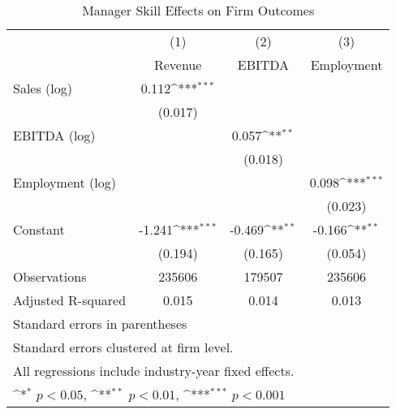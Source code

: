 \begin{table}[htbp]\centering
\def\sym#1{\ifmmode^{#1}\else\(^{#1}\)\fi}
\caption{Manager Skill Effects on Firm Outcomes}
\begin{tabular}{l*{3}{c}}
\toprule
                    &\multicolumn{1}{c}{(1)}&\multicolumn{1}{c}{(2)}&\multicolumn{1}{c}{(3)}\\
                    &\multicolumn{1}{c}{Revenue}&\multicolumn{1}{c}{EBITDA}&\multicolumn{1}{c}{Employment}\\
\midrule
Sales (log)         &       0.112\sym{***}&                     &                     \\
                    &     (0.017)         &                     &                     \\
\addlinespace
EBITDA (log)        &                     &       0.057\sym{**} &                     \\
                    &                     &     (0.018)         &                     \\
\addlinespace
Employment (log)    &                     &                     &       0.098\sym{***}\\
                    &                     &                     &     (0.023)         \\
\addlinespace
Constant            &      -1.241\sym{***}&      -0.469\sym{**} &      -0.166\sym{**} \\
                    &     (0.194)         &     (0.165)         &     (0.054)         \\
\midrule
Observations        &      235606         &      179507         &      235606         \\
Adjusted R-squared  &       0.015         &       0.014         &       0.013         \\
\bottomrule
\multicolumn{4}{l}{\footnotesize Standard errors in parentheses}\\
\multicolumn{4}{l}{\footnotesize Standard errors clustered at firm level.}\\
\multicolumn{4}{l}{\footnotesize All regressions include industry-year fixed effects.}\\
\multicolumn{4}{l}{\footnotesize \sym{*} \(p<0.05\), \sym{**} \(p<0.01\), \sym{***} \(p<0.001\)}\\
\end{tabular}
\end{table}
